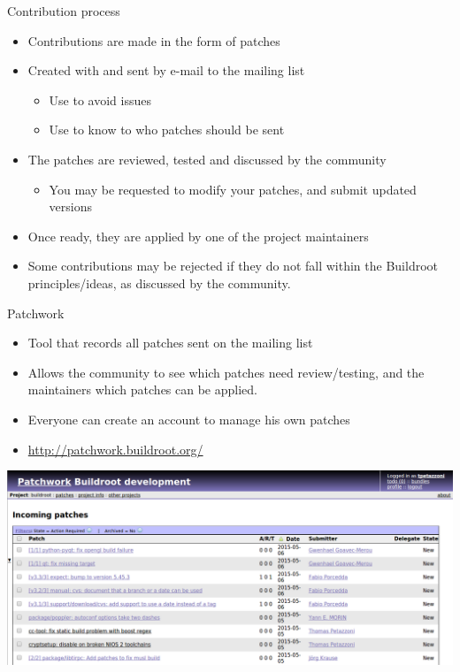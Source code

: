 \begin{frame}{Contribution process}
  \begin{itemize}
  \item Contributions are made in the form of patches
  \item Created with  and sent by e-mail to the mailing list
    \begin{itemize}
    \item Use  to avoid issues
    \item Use  to know to who patches should be
      sent
    \end{itemize}
  \item The patches are reviewed, tested and discussed by the
    community
    \begin{itemize}
    \item You may be requested to modify your patches, and submit
      updated versions
    \end{itemize}
  \item Once ready, they are applied by one of the project maintainers
  \item Some contributions may be rejected if they do not fall within
    the Buildroot principles/ideas, as discussed by the community.
  \end{itemize}
\end{frame}

\begin{frame}{Patchwork}
  \begin{itemize}
  \item Tool that records all patches sent on the mailing list
  \item Allows the community to see which patches need review/testing,
    and the maintainers which patches can be applied.
  \item Everyone can create an account to manage his own patches
  \item \url{http://patchwork.buildroot.org/}
  \end{itemize}

  \begin{center}
    \includegraphics[width=\textwidth]{slides/buildroot-support-contribution/patchwork.png}
  \end{center}
\end{frame}

